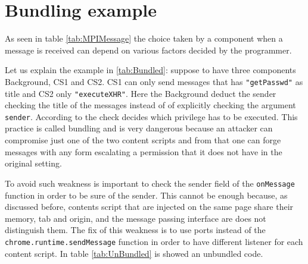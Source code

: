 \section{Bundling example}
\label{sec:BundlingExample}
As seen in table \ref{tab:MPIMessage} the choice taken by a component when a message is received can depend on various factors decided by the programmer.

Let us explain the example in \ref{tab:Bundled}: suppose to have three components Background, CS1 and CS2. CS1 can only send messages that has \texttt{"getPasswd"} as title and CS2 only \texttt{"executeXHR"}. Here the Background deduct the sender checking the title of the messages instead of of explicitly checking the argument \texttt{sender}. According to the check decides which privilege has to be executed. This practice is called bundling and is very dangerous because an attacker can compromise just one of the two content scripts and from that one can forge messages with any form escalating a permission that it does not have in the original setting.

To avoid such weakness is important to check the sender field of the \texttt{onMessage} function in order to be sure of the sender. This cannot be enough because, as discussed before, contents script that are injected on the same page share their memory, tab and origin, and the message passing interface are does not distinguish them. The fix of this weakness is to use ports instead of the \texttt{chrome.runtime.sendMessage} function in order to have different listener for each content script. In table \ref{tab:UnBundled} is showed an unbundled code.

